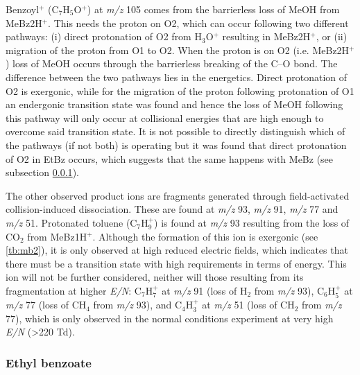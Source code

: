 Benzoyl$^+$ (C$_7$H$_5$O$^+$) at \textit{m/z} 105 comes from the barrierless loss of MeOH from MeBz2H$^+$. 
%
This needs the proton on O2, which can occur following two different pathways: (i) direct protonation of O2 from H$_3$O$^+$ resulting in MeBz2H$^+$, or (ii) migration of the proton from O1 to O2.
%
When the proton is on O2 (i.e. MeBz2H$^+$) loss of MeOH occurs through the barrierless breaking of the C--O bond. 
%
The difference between the two pathways lies in the energetics. 
%
Direct protonation of O2 is exergonic, while for the migration of the proton following protonation of O1 an endergonic transition state was found and hence the loss of MeOH following this pathway will only occur at collisional energies that are high enough to overcome said transition state.
%
It is not possible to directly distinguish which of the pathways (if not both) is operating but it was found that direct protonation of O2 in EtBz occurs, which suggests that the same happens with MeBz (see subsection \ref{section:etbz}). 


The other observed product ions are fragments generated through field-activated collision-induced dissociation. 
%
These are found at \textit{m/z} 93, \textit{m/z} 91, \textit{m/z} 77 and \textit{m/z} 51.
%
Protonated toluene (C$_7$H$_9^+$) is found at \textit{m/z} 93 resulting from the loss of CO$_2$ from MeBz1H$^+$.
%
Although the formation of this ion is exergonic (see \autoref{tb:mb2}), it is only observed at high reduced electric fields, which indicates that there must be a transition state with high  requirements in terms of energy. 
%
This ion will not be further considered, neither will those resulting from its fragmentation at higher \textit{E/N}:
C$_7$H$_7^+$ at \textit{m/z} 91 (loss of H$_2$ from \textit{m/z} 93),
C$_6$H$_5^+$ at \textit{m/z} 77 (loss of CH$_4$ from \textit{m/z} 93), 
and
C$_4$H$_3^+$ at \textit{m/z} 51 (loss of CH$_2$ from \textit{m/z} 77), which is only observed in the normal conditions experiment at very high \textit{E/N} (>220 Td).














\subsubsection{Ethyl benzoate}\label{section:etbz}

